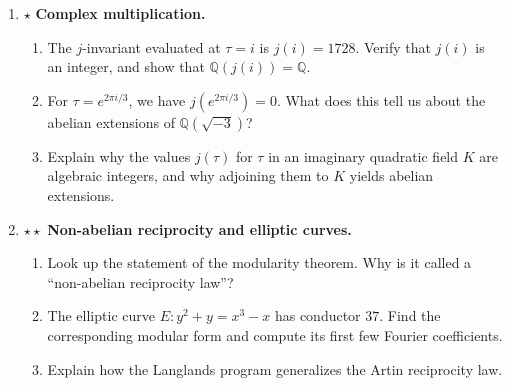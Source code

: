 \begin{enumerate}
    \item $\star$ \textbf{Complex multiplication.}
    \begin{enumerate}
        \item The $j$-invariant evaluated at $\tau = i$ is $j(i) = 1728$. Verify that $j(i)$ is an integer, and show that $\mathbb{Q}(j(i)) = \mathbb{Q}$.
        \item For $\tau = e^{2\pi i/3}$, we have $j(e^{2\pi i/3}) = 0$. What does this tell us about the abelian extensions of $\mathbb{Q}(\sqrt{-3})$?
        \item Explain why the values $j(\tau)$ for $\tau$ in an imaginary quadratic field $K$ are algebraic integers, and why adjoining them to $K$ yields abelian extensions.
    \end{enumerate}

    \item $\star\star$ \textbf{Non-abelian reciprocity and elliptic curves.}
    \begin{enumerate}
        \item Look up the statement of the modularity theorem. Why is it called a ``non-abelian reciprocity law''?
        \item The elliptic curve $E: y^2 + y = x^3 - x$ has conductor $37$. Find the corresponding modular form and compute its first few Fourier coefficients.
        \item Explain how the Langlands program generalizes the Artin reciprocity law.
    \end{enumerate}

\end{enumerate}
